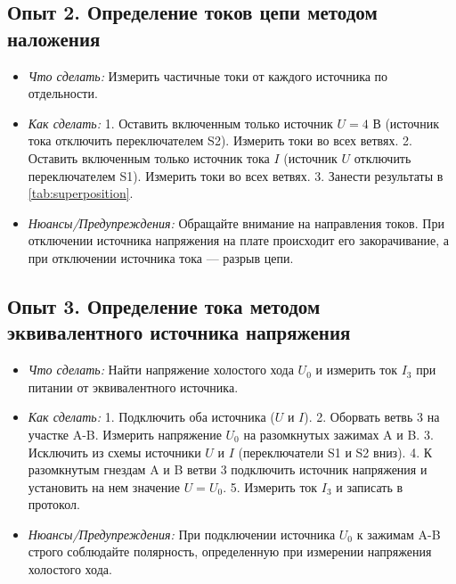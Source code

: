 \subsection*{Опыт 2. Определение токов цепи методом наложения}
\begin{itemize}
    \item \textit{Что сделать:} Измерить частичные токи от каждого источника по отдельности.
    \item \textit{Как сделать:}
    1. Оставить включенным только источник $U = 4$ В (источник тока отключить переключателем S2). Измерить токи во всех ветвях.
    2. Оставить включенным только источник тока $I$ (источник $U$ отключить переключателем S1). Измерить токи во всех ветвях.
    3. Занести результаты в \cref{tab:superposition}.
    \item \textit{Нюансы/Предупреждения:} Обращайте внимание на направления токов. При отключении источника напряжения на плате происходит его закорачивание, а при отключении источника тока — разрыв цепи.
\end{itemize}

\subsection*{Опыт 3. Определение тока методом эквивалентного источника напряжения}
\begin{itemize}
    \item \textit{Что сделать:} Найти напряжение холостого хода $U_0$ и измерить ток $I_3$ при питании от эквивалентного источника.
    \item \textit{Как сделать:}
    1. Подключить оба источника ($U$ и $I$).
    2. Оборвать ветвь 3 на участке A-B. Измерить напряжение $U_0$ на разомкнутых зажимах A и B.
    3. Исключить из схемы источники $U$ и $I$ (переключатели S1 и S2 вниз).
    4. К разомкнутым гнездам A и B ветви 3 подключить источник напряжения и установить на нем значение $U = U_0$.
    5. Измерить ток $I_3$ и записать в протокол.
    \item \textit{Нюансы/Предупреждения:} При подключении источника $U_0$ к зажимам A-B строго соблюдайте полярность, определенную при измерении напряжения холостого хода.
\end{itemize}

